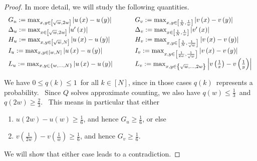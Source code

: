 \begin{proof}
In more detail, we will study the following quantities.
\begin{equation}
\begin{tabular}
[c]{ll}
$G_{u}:=\max_{x,y\in\left[  \sqrt{w},2w\right]  }\left\vert u\left(  x\right)
-u\left(  y\right)  \right\vert ~\ \ \ \ \ \ $ & $G_{v}:=\max_{x,y\in\left[
\frac{1}{N},\frac{1}{w}\right]  }\left\vert v\left(  x\right)  -v\left(
y\right)  \right\vert $\\
$\Delta_{u}:=\max_{x\in\left[  \sqrt{w},2w\right]  }\left\vert u^{\prime
}\left(  x\right)  \right\vert $ & $\Delta_{v}:=\max_{x\in\left[  \frac{1}
{N},\frac{1}{w}\right]  }\left\vert v^{\prime}\left(  x\right)  \right\vert
$\\
$H_{u}:=\max_{x,y\in\left[  \sqrt{w},N\right]  }\left\vert u\left(  x\right)
-u\left(  y\right)  \right\vert $ & $H_{v}:=\max_{x,y\in\left[  \frac{1}
{N},\frac{1}{\sqrt{w}}\right]  }\left\vert v\left(  x\right)  -v\left(
y\right)  \right\vert $\\
$I_{u}:=\max_{x,y\in\left[  w,N\right]  }\left\vert u\left(  x\right)
-u\left(  y\right)  \right\vert $ & $I_{v}:=\max_{x,y\in\left[  \frac{1}
{2w},\frac{1}{\sqrt{w}}\right]  }\left\vert v\left(  x\right)  -v\left(
y\right)  \right\vert $\\
$L_{u}:=\max_{x,y\in\left\{  w,\ldots,N\right\}  }\left\vert u\left(
x\right)  -u\left(  y\right)  \right\vert $ & $L_{v}:=\max_{x,y\in\left\{
\sqrt{w},\ldots,2w\right\}  }\left\vert v\left(  \frac{1}{x}\right)  -v\left(
\frac{1}{y}\right)  \right\vert $
\end{tabular}
\end{equation}


We have $0\leq q\left(  k\right)  \leq1$\ for all $k\in\left[  N\right]  $,
since in those cases $q\left(  k\right)  $\ represents a probability. \ Since
$Q$ solves approximate counting, we also have $q\left(  w\right)  \leq\frac
{1}{3}$\ and $q\left(  2w\right)  \geq\frac{2}{3}$. \ This means in particular
that either

\begin{enumerate}
\item[(i)] $u\left(  2w\right)  -u\left(  w\right)  \geq\frac{1}{6}$, and
hence $G_{u}\geq\frac{1}{6}$, or else

\item[(ii)] $v\left(  \frac{1}{2w}\right)  -v\left(  \frac{1}{w}\right)
\geq\frac{1}{6}$, and hence $G_{v}\geq\frac{1}{6}$.
\end{enumerate}

We will show that either case leads to a contradiction.


\end{proof}
